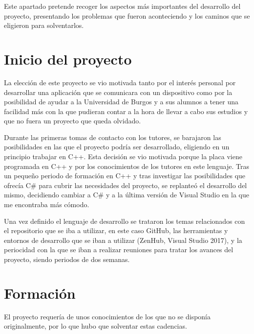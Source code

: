
Este apartado pretende recoger los aspectos más importantes del desarrollo del proyecto, presentando los problemas que fueron aconteciendo y los caminos que se eligieron para solventarlos.

\section{Inicio del proyecto}

La elección de este proyecto se vio motivada tanto por el interés personal por desarrollar una aplicación que se comunicara con un dispositivo como por la posibilidad de ayudar a la Universidad de Burgos y a sus alumnos a tener una facilidad más con la que pudieran contar a la hora de llevar a cabo sus estudios y que no fuera un proyecto que queda olvidado.

Durante las primeras tomas de contacto con los tutores, se barajaron las posibilidades en las que el proyecto podría ser desarrollado, eligiendo en un principio trabajar en C++. Esta decisión se vio motivada porque la placa viene programada en C++ y por los conocimientos de los tutores en este lenguaje. Tras un pequeño periodo de formación en C++ y tras investigar las posibilidades que ofrecía C\# para cubrir las necesidades del proyecto, se replanteó el desarrollo del mismo, decidiendo cambiar a C\# y a la última versión de Visual Studio en la que me encontraba más cómodo.

Una vez definido el lenguaje de desarrollo se trataron los temas relacionados con el repositorio que se iba a utilizar, en este caso GitHub, las herramientas y entornos de desarrollo que se iban a utilizar (ZenHub, Visual Studio 2017), y la periocidad con la que se iban a realizar reuniones para tratar los avances del proyecto, siendo periodos de dos semanas.

\section{Formación}

El proyecto requería de unos conocimientos de los que no se disponía originalmente, por lo que hubo que solventar estas cadencias.